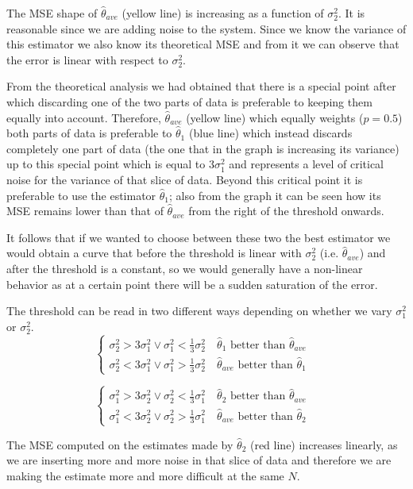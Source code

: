 The MSE shape of $\hat \theta_{ave}$ (yellow line) is increasing as a function of $\sigma^2_2$. It is reasonable since we are adding noise to the system. Since we know the variance of this estimator we also know its theoretical MSE and from it we can observe that the error is linear with respect to $\sigma_2^2$.

From the theoretical analysis we had obtained that there is a special point after which discarding one of the two parts of data is preferable to keeping them equally into account. Therefore, $\hat \theta_{ave}$ (yellow line) which equally weights ($p=0.5$) both parts of data is preferable to $\hat\theta_1$ (blue line) which instead discards completely one part of data (the one that in the graph is increasing its variance) up to this special point which is equal to $3\sigma_1^2$ and represents a level of critical noise for the variance of that slice of data. Beyond this critical point it is preferable to use the estimator $\hat \theta_1$; also from the graph it can be seen how its MSE remains lower than that of $\hat \theta_{ave}$ from the right of the threshold onwards.

It follows that if we wanted to choose between these two the best estimator we would obtain a curve that before the threshold is linear with $\sigma^2_2$ (i.e. $\hat \theta_{ave}$) and after the threshold is a constant, so we would generally have a non-linear behavior as at a certain point there will be a sudden saturation of the error.

The threshold can be read in two different ways depending on whether we vary $\sigma_1^2$ or $\sigma_2^2$.    
\[
\begin{cases}
\sigma_2^2>3\sigma_1^2 \lor \sigma_1^2<\frac 13\sigma_2^2\quad\text{$\hat\theta_1$ better than $\hat \theta_{ave}$}\\
\sigma_2^2<3\sigma_1^2\lor \sigma_1^2>\frac13\sigma_2^2\quad\text{$\hat \theta_{ave}$ better than $\hat \theta_1$ }
\end{cases}
\]
    
\[
    \begin{cases}
    \sigma_1^2>3\sigma_2^2\lor \sigma_2^2<\frac 13\sigma_1^2\quad\text{$\hat\theta_2$ better than $\hat \theta_{ave}$}\\
    \sigma_1^2<3\sigma_2^2\lor \sigma_2^2>\frac13\sigma_1^2\quad\text{$\hat \theta_{ave}$ better than $\hat \theta_2$ }
    \end{cases}
\]

The MSE computed on the estimates made by $\hat \theta_2$ (red line) increases linearly, as we are inserting more and more noise in that slice of data and therefore we are making the estimate more and more difficult at the same $N$.

